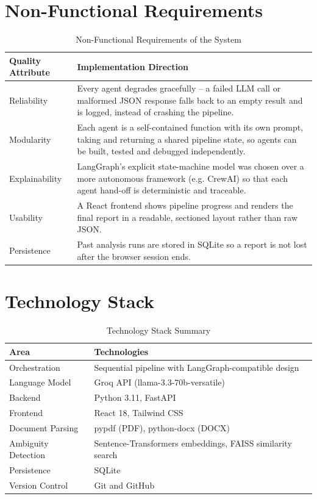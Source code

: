 \documentclass[12pt,a4paper,openany]{report}
\begin{document}
\section{Non-Functional Requirements}
\begin{table}[H]
\centering
\caption{Non-Functional Requirements of the System}
\label{tab:nonfunctional}
\begin{tabularx}{\textwidth}{|>{\raggedright\arraybackslash}p{3.6cm}|X|}
\hline
\textbf{Quality Attribute} & \textbf{Implementation Direction} \\
\hline
Reliability & Every agent degrades gracefully -- a failed LLM call or malformed JSON response falls back to an empty result and is logged, instead of crashing the pipeline. \\
\hline
Modularity & Each agent is a self-contained function with its own prompt, taking and returning a shared pipeline state, so agents can be built, tested and debugged independently. \\
\hline
Explainability & LangGraph's explicit state-machine model was chosen over a more autonomous framework (e.g. CrewAI) so that each agent hand-off is deterministic and traceable. \\
\hline
Usability & A React frontend shows pipeline progress and renders the final report in a readable, sectioned layout rather than raw JSON. \\
\hline
Persistence & Past analysis runs are stored in SQLite so a report is not lost after the browser session ends. \\
\hline
\end{tabularx}
\end{table}

\section{Technology Stack}
\begin{table}[H]
\centering
\caption{Technology Stack Summary}
\label{tab:techstack}
\begin{tabularx}{\textwidth}{|p{3.2cm}|X|}
\hline
\textbf{Area} & \textbf{Technologies} \\
\hline
Orchestration & Sequential pipeline with LangGraph-compatible design \\
\hline
Language Model & Groq API (llama-3.3-70b-versatile) \\
\hline
Backend & Python 3.11, FastAPI \\
\hline
Frontend & React 18, Tailwind CSS \\
\hline
Document Parsing & pypdf (PDF), python-docx (DOCX) \\
\hline
Ambiguity Detection & Sentence-Transformers embeddings, FAISS similarity search \\
\hline
Persistence & SQLite \\
\hline
Version Control & Git and GitHub \\
\hline
\end{tabularx}
\end{table}
\FloatBarrier
\end{document}
